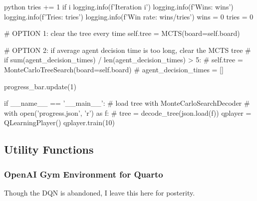 \begin{mintedbox}{python}
            tries += 1
            if i %
                logging.info(f'Iteration {i}')
                logging.info(f'Wins: {wins}')
                logging.info(f'Tries: {tries}')
                logging.info(f'Win rate: {wins/tries}')
                wins = 0
                tries = 0

            # OPTION 1: clear the tree every time
            self.tree = MCTS(board=self.board)

            # OPTION 2: if average agent decision time is too long, clear the MCTS tree
            # if sum(agent_decision_times) / len(agent_decision_times) > 5:
            #     self.tree = MonteCarloTreeSearch(board=self.board)
            #     agent_decision_times = []

            progress_bar.update(1)


if __name__ == '__main__':
    # load tree with MonteCarloSearchDecoder
    # with open('progress.json', 'r') as f:
    #     tree = decode_tree(json.load(f))
    qplayer = QLearningPlayer()
    qplayer.train(10)

\end{mintedbox}

\subsection{Utility Functions}

\subsubsection{OpenAI Gym Environment for Quarto}

Though the DQN is abandoned, I leave this here for posterity.

